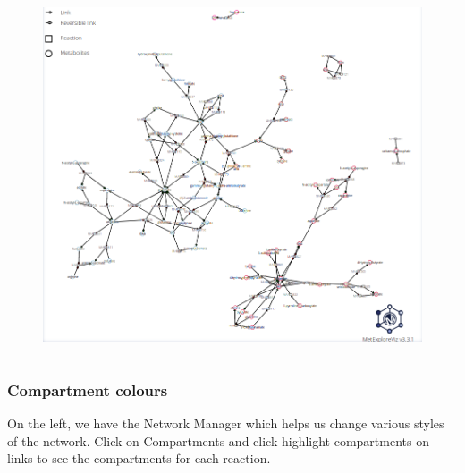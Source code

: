\documentclass[
  24px,
  letterpaper,
  DIV=11,
  numbers=noendperiod]{scrartcl}
\begin{document}
\begin{figure}

{\centering \includegraphics{images/metexplore_viz_2.png}

}

\end{figure}

\begin{center}\rule{0.5\linewidth}{0.5pt}\end{center}

\hypertarget{compartment-colours}{%
\subsubsection{Compartment colours}\label{compartment-colours}}

On the left, we have the Network Manager which helps us change various
styles of the network. Click on Compartments and click highlight
compartments on links to see the compartments for each reaction.
\end{document}
